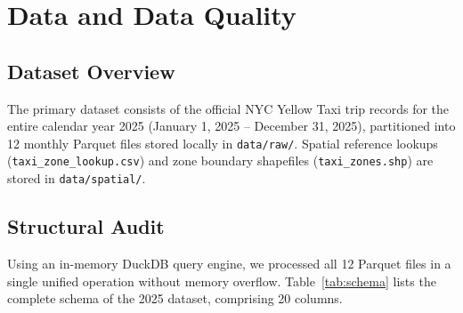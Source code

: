 \documentclass[11pt,a4paper]{article}
\begin{document}
\section{Data and Data Quality}

\subsection{Dataset Overview}
The primary dataset consists of the official NYC Yellow Taxi trip records for the entire calendar year 2025 (January 1, 2025 -- December 31, 2025), partitioned into 12 monthly Parquet files stored locally in \texttt{data/raw/}. Spatial reference lookups (\texttt{taxi\_zone\_lookup.csv}) and zone boundary shapefiles (\texttt{taxi\_zones.shp}) are stored in \texttt{data/spatial/}.

\subsection{Structural Audit}
Using an in-memory DuckDB query engine, we processed all 12 Parquet files in a single unified operation without memory overflow. Table~\ref{tab:schema} lists the complete schema of the 2025 dataset, comprising 20 columns.
\end{document}

